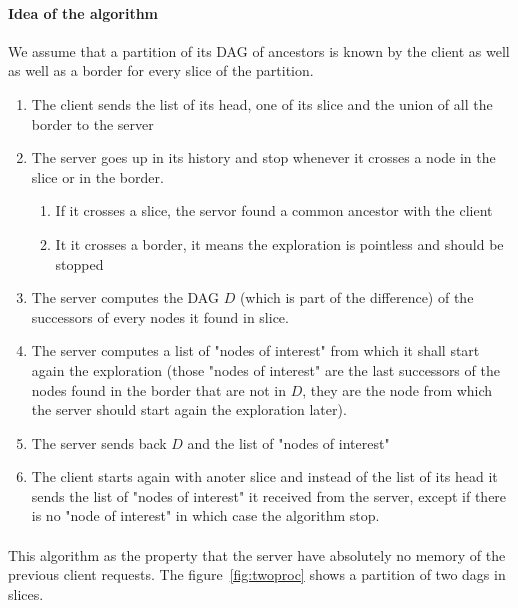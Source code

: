 \paragraph{Idea of the algorithm} We assume that a partition of its DAG of ancestors is known by the client as well as well as a border for every slice of the partition.
\begin{enumerate}
 \item The client sends the list of its head, one of its slice and the union of all the border to the server
 \item The server goes up in its history and stop whenever it crosses a node in the slice or in the border.
 \begin{enumerate}
  \item If it crosses a slice, the servor found a common ancestor with the client
  \item It it crosses a border, it means the exploration is pointless and should be stopped
 \end{enumerate}
 \item The server computes the DAG $D$ (which is part of the difference) of the successors of every nodes it found in slice.
 \item The server computes a list of "nodes of interest" from which it shall start again the exploration (those "nodes of interest" are the last successors of the nodes found in the border that are not in $D$, they are the node from which the server should start again the exploration later).
 \item The server sends back $D$ and the list of "nodes of interest"
 \item The client starts again with anoter slice and instead of the list of its head it sends the list of "nodes of interest" it received from the server, except if there is no "node of interest" in which case the algorithm stop.
\end{enumerate}
\paragraph{} This algorithm as the property that the server have absolutely no memory of the previous client requests. The figure~\ref{fig:twoproc} shows a partition of two dags in slices.

